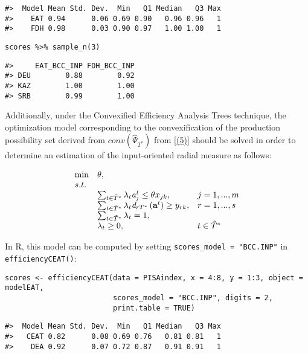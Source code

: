 \begin{verbatim}
#>  Model Mean Std. Dev.  Min   Q1 Median   Q3 Max
#>    EAT 0.94      0.06 0.69 0.90   0.96 0.96   1
#>    FDH 0.98      0.03 0.90 0.97   1.00 1.00   1
\end{verbatim}

\begin{verbatim}
scores %>% sample_n(3)
\end{verbatim}

\begin{verbatim}
#>     EAT_BCC_INP FDH_BCC_INP
#> DEU        0.88        0.92
#> KAZ        1.00        1.00
#> SRB        0.99        1.00
\end{verbatim}

Additionally, under the Convexified Efficiency Analysis Trees technique, the optimization model corresponding to the convexification of the production possibility set derived from \(conv(\hat{\Psi }_{T^{*}})\) from \eqref{(5)} should be solved in order to determine an estimation of the input-oriented radial measure as follows:

\begin{equation} \label{(18)} 
\begin{array}{lllll} 
{} & {\min } & {\theta,} & {} & {}  \\
{} & {s.t.} & {} & {} & {} \\ 
{} & {} & {\sum_{t\in \tilde{T}^{*} }^{}\lambda_{t} {\it a}_{j}^{t}  \le \theta_{} x_{jk} ,} & {j=1,...,m} & {} \\ 
{} & {} & {\sum_{t\in \tilde{T}^{*} }^{}\lambda_{t} {\it d}_{rT^{*}} \left({\it \textbf{a}}^{t} \right) \ge y_{rk} ,} & {r=1,...,s} & {} \\ 
{} & {} & {\sum_{t\in \tilde{T}^{*} }^{}\lambda_{t}  =1,} & {} & {} \\ 
{} & {} & {\lambda _{t} \ge 0,} & {t\in \tilde{T}^{*} } & {} 
\end{array} 
\end{equation}

In R, this model can be computed by setting \texttt{scores\_model\ =\ "BCC.INP"} in \texttt{efficiencyCEAT()}:

\begin{verbatim}
scores <- efficiencyCEAT(data = PISAindex, x = 4:8, y = 1:3, object = modelEAT, 
                         scores_model = "BCC.INP", digits = 2, 
                         print.table = TRUE)
\end{verbatim}

\begin{verbatim}
#>  Model Mean Std. Dev.  Min   Q1 Median   Q3 Max
#>   CEAT 0.82      0.08 0.69 0.76   0.81 0.81   1
#>    DEA 0.92      0.07 0.72 0.87   0.91 0.91   1
\end{verbatim}

